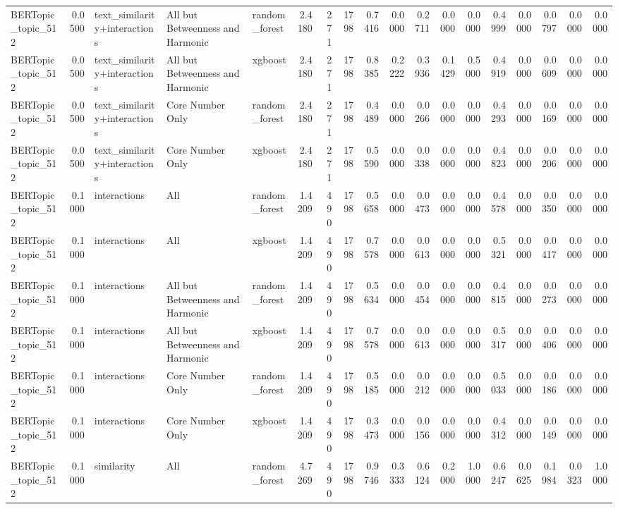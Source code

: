 \begin{tabular}{lrlllrrrrrrrrrrrrr}
BERTopic_topic_512 & 0.0500 & text_similarity+interactions & All but Betweenness and Harmonic & random_forest & 2.4180 & 271 & 1798 & 0.7416 & 0.0000 & 0.2711 & 0.0000 & 0.0000 & 0.4999 & 0.0000 & 0.0797 & 0.0000 & 0.0000 \\
BERTopic_topic_512 & 0.0500 & text_similarity+interactions & All but Betweenness and Harmonic & xgboost & 2.4180 & 271 & 1798 & 0.8385 & 0.2222 & 0.3936 & 0.1429 & 0.5000 & 0.4919 & 0.0000 & 0.0609 & 0.0000 & 0.0000 \\
BERTopic_topic_512 & 0.0500 & text_similarity+interactions & Core Number Only & random_forest & 2.4180 & 271 & 1798 & 0.4489 & 0.0000 & 0.0266 & 0.0000 & 0.0000 & 0.4293 & 0.0000 & 0.0169 & 0.0000 & 0.0000 \\
BERTopic_topic_512 & 0.0500 & text_similarity+interactions & Core Number Only & xgboost & 2.4180 & 271 & 1798 & 0.5590 & 0.0000 & 0.0338 & 0.0000 & 0.0000 & 0.4823 & 0.0000 & 0.0206 & 0.0000 & 0.0000 \\
BERTopic_topic_512 & 0.1000 & interactions & All & random_forest & 1.4209 & 490 & 1798 & 0.5658 & 0.0000 & 0.0473 & 0.0000 & 0.0000 & 0.4578 & 0.0000 & 0.0350 & 0.0000 & 0.0000 \\
BERTopic_topic_512 & 0.1000 & interactions & All & xgboost & 1.4209 & 490 & 1798 & 0.7578 & 0.0000 & 0.0613 & 0.0000 & 0.0000 & 0.5321 & 0.0000 & 0.0417 & 0.0000 & 0.0000 \\
BERTopic_topic_512 & 0.1000 & interactions & All but Betweenness and Harmonic & random_forest & 1.4209 & 490 & 1798 & 0.5634 & 0.0000 & 0.0454 & 0.0000 & 0.0000 & 0.4815 & 0.0000 & 0.0273 & 0.0000 & 0.0000 \\
BERTopic_topic_512 & 0.1000 & interactions & All but Betweenness and Harmonic & xgboost & 1.4209 & 490 & 1798 & 0.7578 & 0.0000 & 0.0613 & 0.0000 & 0.0000 & 0.5317 & 0.0000 & 0.0406 & 0.0000 & 0.0000 \\
BERTopic_topic_512 & 0.1000 & interactions & Core Number Only & random_forest & 1.4209 & 490 & 1798 & 0.5185 & 0.0000 & 0.0212 & 0.0000 & 0.0000 & 0.5033 & 0.0000 & 0.0186 & 0.0000 & 0.0000 \\
BERTopic_topic_512 & 0.1000 & interactions & Core Number Only & xgboost & 1.4209 & 490 & 1798 & 0.3473 & 0.0000 & 0.0156 & 0.0000 & 0.0000 & 0.4312 & 0.0000 & 0.0149 & 0.0000 & 0.0000 \\
BERTopic_topic_512 & 0.1000 & similarity & All & random_forest & 4.7269 & 490 & 1798 & 0.9746 & 0.3333 & 0.6124 & 0.2000 & 1.0000 & 0.6247 & 0.0625 & 0.1984 & 0.0323 & 1.0000 \\

\end{tabular}
